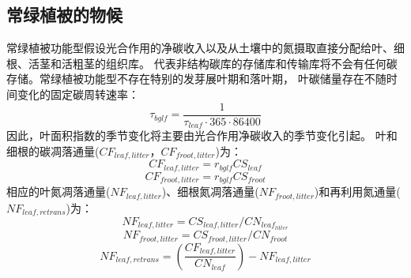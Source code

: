 

\subsection{常绿植被的物候}\label{常绿植被的物候}
常绿植被功能型假设光合作用的净碳收入以及从土壤中的氮摄取直接分配给叶、细根、活茎和活粗茎的组织库。
代表非结构碳库的存储库和传输库将不会有任何碳存储。常绿植被功能型不存在特别的发芽展叶期和落叶期，
叶碳储量存在不随时间变化的固定碳周转速率：
\begin{equation}
\tau_{bglf}=\frac{1}{\tau_{leaf} \cdot 365 \cdot 86400}
\end{equation}
因此，叶面积指数的季节变化将主要由光合作用净碳收入的季节变化引起。
叶和细根的碳凋落通量($CF_{leaf,litter}$，$CF_{froot,litter}$)为：
\begin{equation}
CF_{leaf,litter}=r_{bglf} CS_{leaf}
\end{equation}
\begin{equation}
CF_{froot,litter}=r_{bglf} CS_{froot}
\end{equation}
相应的叶氮凋落通量($NF_{leaf,litter}$)、细根氮凋落通量($NF_{froot,litter}$)和再利用氮通量($NF_{leaf,retrans}$)为：
\begin{equation}
N F_{leaf,litter}=CS_{leaf,litter} / CN_{leaf_{litter}}
\end{equation}
\begin{equation}
N F_{froot,litter}=CS_{froot,litter} / CN_{froot}
\end{equation}
\begin{equation}
N F_{leaf,retrans}=\left(\frac{CF_{leaf,litter }}{CN_{leaf}}\right)-N F_{leaf,litter}
\end{equation}


